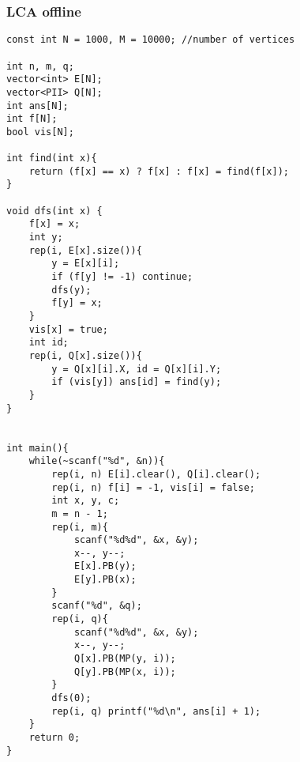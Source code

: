 \subsubsection{LCA offline}
\begin{verbatim}
const int N = 1000, M = 10000; //number of vertices

int n, m, q;
vector<int> E[N];
vector<PII> Q[N];
int ans[N];
int f[N];
bool vis[N];

int find(int x){
	return (f[x] == x) ? f[x] : f[x] = find(f[x]);
}

void dfs(int x) {
	f[x] = x;
	int y;
	rep(i, E[x].size()){
		y = E[x][i];
		if (f[y] != -1) continue;
		dfs(y);
		f[y] = x;
	}
	vis[x] = true;
	int id;
	rep(i, Q[x].size()){
		y = Q[x][i].X, id = Q[x][i].Y;
		if (vis[y]) ans[id] = find(y);
	}
}


int main(){
	while(~scanf("%d", &n)){
		rep(i, n) E[i].clear(), Q[i].clear();
		rep(i, n) f[i] = -1, vis[i] = false;
		int x, y, c;
		m = n - 1;
		rep(i, m){
			scanf("%d%d", &x, &y);
			x--, y--;
			E[x].PB(y);
			E[y].PB(x);
		}
		scanf("%d", &q);
		rep(i, q){
			scanf("%d%d", &x, &y);
			x--, y--;
			Q[x].PB(MP(y, i));
			Q[y].PB(MP(x, i));
		}
		dfs(0);
		rep(i, q) printf("%d\n", ans[i] + 1);
	}
	return 0;
}
\end{verbatim}
